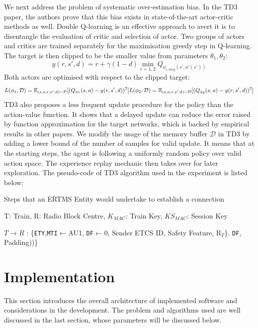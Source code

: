 \documentclass[oneside,11pt,a4paper]{article}
\begin{document}
\newline
\newline
\noindent
We next address the problem of systematic over-estimation bias. In the TD3 paper, the authors prove that this bias exists in state-of-the-art actor-critic methods as well. Double Q-learning is an effective approach to avert it is to disentangle the evaluation of critic and selection of actor. Two groups of actors and critics are trained separately for the maximisation greedy step in Q-learning. The target is then clipped to be the smaller value from parameters $\theta_1,\theta_2$:
$$
y(r,s',d) = r+\gamma(1-d) \min_{i=1,2}Q_{\phi_{i,targ}(s',a'(s'))}
$$
Both actors are optimised with respect to the clipped target:
$$
L(\phi_1,\mathcal D) = \mathbb E_{(s,a,r,s',d)\sim \mathcal D}[(Q_{\phi_1}(s,a) - y(r,s',d))^2] \\ L(\phi_2,\mathcal D) = \mathbb E_{(s,a,r,s',d)\sim \mathcal D}[(Q_{\phi_2}(s,a) - y(r,s',d))^2]
$$
TD3 also proposes a less frequent update procedure for the policy than the action-value function. It shows that a delayed update can reduce the error raised by function approximation for the target networks, which is backed by empirical results in other papers. We modify the usage of the memory buffer $\mathcal D$ in TD3 by adding a lower bound of the number of samples for valid update. It means that at the starting steps, the agent is following a uniformly random policy over valid action space. The experience replay mechanic then takes over for later exploration.
\newline
\newline
\noindent
The pseudo-code of TD3 algorithm used in the experiment is listed below:
\begin{algorithm}[H]
    \renewcommand{\thealgorithm}{}
    \caption{Steps that an ERTMS Entity would undertake to establish a connection}
    T: Train, R: Radio Block Centre, $K_{MAC}$: Train Key, $KS_{MAC}$: Session Key
    \label{EuroRadio Protocol}
    \begin{algorithmic}[1]
        \STATE $T\rightarrow{R}$ : \{\texttt{ETY},\texttt{MTI}$\gets$AU1, \texttt{DF}$\gets$0, Sender ETCS ID, Safety Feature, R$_T$\}.
        \texttt{DF}, Padding))\}
    \end{algorithmic}
\end{algorithm}


\newpage
\section{Implementation}
This section introduces the overall architecture of implemented software and considerations in the development. The problem and algorithms used are well discussed in the last section, whose parameters will be discussed below.
\end{document}
